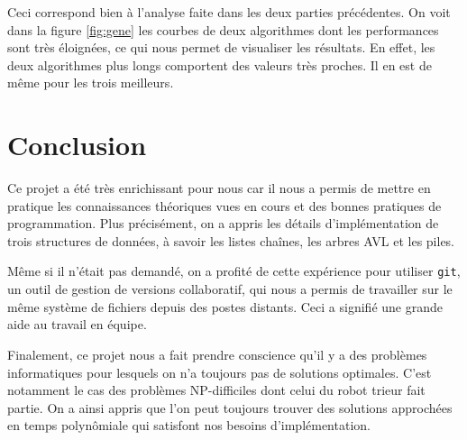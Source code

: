 \documentclass[12pt,a4paper]{article}
\begin{document}
Ceci correspond bien \`a l'analyse faite dans les deux parties pr\'ec\'edentes.
On voit dans la figure \ref{fig:gene} les courbes de deux algorithmes dont les 
performances sont tr\`es \'eloign\'ees, ce qui nous permet de visualiser les 
r\'esultats. En effet, les deux algorithmes plus longs comportent des valeurs 
tr\`es proches. Il en est de m\^eme pour les trois meilleurs.

\newpage

\part*{Conclusion}
Ce projet a \'et\'e tr\`es enrichissant pour nous car il nous a permis de 
mettre en pratique les connaissances th\'eoriques vues en cours et des 
bonnes pratiques de programmation. Plus pr\'ecis\'ement, on a appris les 
d\'etails d'impl\'ementation de trois structures de donn\'ees, \`a savoir les 
listes cha\^ines, les arbres AVL et les piles.

M\^eme si il n'\'etait pas demand\'e, on a profit\'e de cette exp\'erience pour 
utiliser \texttt{git}, un outil de gestion de versions collaboratif, qui 
nous a permis de travailler sur le m\^eme syst\`eme de fichiers depuis des 
postes distants. Ceci a signifi\'e une grande aide au travail en \'equipe.

Finalement, ce projet nous a fait prendre conscience qu'il y a des probl\`emes 
informatiques pour lesquels on n'a toujours pas de solutions optimales. C'est 
notamment le cas des probl\`emes NP-difficiles dont celui du robot trieur fait 
partie. On a ainsi appris que l'on peut toujours trouver des solutions 
approch\'ees en temps polyn\^omiale qui satisfont nos besoins 
d'impl\'ementation.

\end{document}
